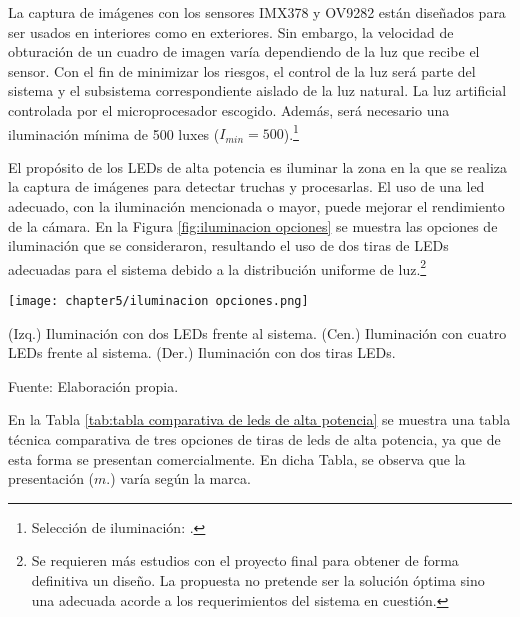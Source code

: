 La captura de imágenes con los sensores IMX378 y OV9282 están diseñados para ser usados en interiores como en exteriores. Sin embargo, la velocidad de obturación de un cuadro de imagen varía dependiendo de la luz que recibe el sensor. Con el fin de minimizar los riesgos, el control de la luz será parte del sistema y el subsistema correspondiente aislado de la luz natural. La luz artificial controlada por el microprocesador escogido. Además, será necesario una iluminación mínima de 500 luxes ($I_{min}=500$).\footnote{Selección de iluminación: \cite{Ryer1997}.}

El propósito de los LEDs de alta potencia es iluminar la zona en la que se realiza la captura de imágenes para detectar truchas y procesarlas. El uso de una led adecuado, con la iluminación mencionada o mayor, puede mejorar el rendimiento de la cámara. En la Figura \ref{fig:iluminacion opciones} se muestra las opciones de iluminación que se consideraron, resultando el uso de dos tiras de LEDs adecuadas para el sistema debido a la distribución uniforme de luz.\footnote{Se requieren más estudios con el proyecto final para obtener de forma definitiva un diseño. La propuesta no pretende ser la solución óptima sino una adecuada acorde a los requerimientos del sistema en cuestión.}

\begin{myfigure}[H]
	\footnotesize\centering
	\texttt{[image: chapter5/iluminacion opciones.png]}
	\caption[Opciones de posicionamiento de iluminación.]{(Izq.) Iluminación con dos LEDs frente al sistema. (Cen.) Iluminación con cuatro LEDs frente al sistema. (Der.) Iluminación con dos tiras LEDs.}
	\begin{myflushcenter}
		Fuente: Elaboración propia.
	\end{myflushcenter}
	\label{fig:iluminacion opciones}
\end{myfigure}

En la Tabla \ref{tab:tabla comparativa de leds de alta potencia} se muestra una tabla técnica comparativa de tres opciones de tiras de leds de alta potencia, ya que de esta forma se presentan comercialmente. En dicha Tabla, se observa que la presentación ($m.$) varía según la marca.

